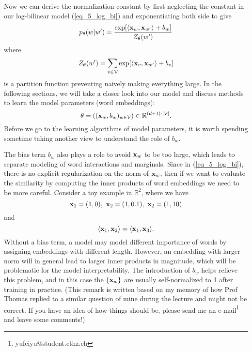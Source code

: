 \documentclass[../book-template.tex]{subfiles}
\begin{document}
\par Now we can derive the normalization constant by first neglecting the constant in our log-bilinear model (\ref{eq_5_log_bi}) and exponentiating both side to give
\begin{equation*}
	p_{\theta}(w|w')=\frac{\exp[\langle {\bf x}_w,{\bf x}_{w'}\rangle + b_w]}{Z_{\theta}(w')}
\end{equation*}
where
\begin{equation*}
	Z_{\theta}(w')= \sum_{v\in \mathcal{V}} \exp[\langle {\bf x}_v,{\bf x}_{w'}\rangle + b_v]
\end{equation*}
is a partition function preventing naively making everything large. In the following sections, we will take a closer look into our model and discuss methods to learn the model parameters (word embeddings):
\begin{equation*}
	\theta = (({\bf x}_w,b_w)_{w\in \mathcal{V}})\in \mathbb{R}^{(d+1)\cdot |\mathcal{V}|}.
\end{equation*}
Before we go to the learning algorithms of model parameters, it is worth spending sometime taking another view to understand the role of $b_w$.
\begin{remark}
	The bias term $b_w$ also plays a role to avoid ${\bf x}_w$ to be too large, which leads to separate modeling of word interactions and marginals. Since in (\ref{eq_5_log_bi}), there is no explicit regularization on the norm of ${\bf x}_w$, then if we want to evaluate the similarity by computing the inner products of word embeddings we need to be more careful. Consider a toy example in $\mathbb{R}^2$, where we have
	\begin{equation*}
		{\bf x}_1 =(1, 0),\ {\bf x}_2=(1,0.1),\ {\bf x}_2=(1,10)
	\end{equation*}
	and 
	\begin{equation*}
		\langle {\bf x}_1,{\bf x}_2\rangle = \langle {\bf x}_1,{\bf x}_3\rangle.
	\end{equation*}
	Without a bias term, a model may model different importance of words by assigning embeddings with different length. However, an embedding with larger norm will in general lead to larger inner products in magnitude, which will be problematic for the model interpretability. The introduction of $b_w$ helps relieve this problem, and in this case the $\{{\bf x}_w\}$ are usually self-normalized to 1 after training in practice. (This remark is written based on my memory of how Prof Thomas replied to a similar question of mine during the lecture and might not be correct. If you have an idea of how things should be, please send me an e-mail\footnote{yufeiyu@student.ethz.ch} and leave some comments!)
\end{remark}
\end{document}
